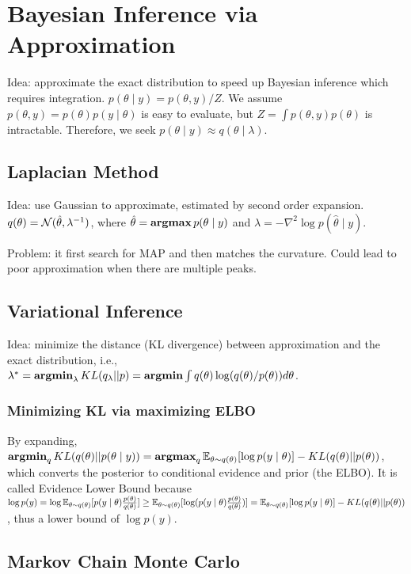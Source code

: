 \section{Bayesian Inference via Approximation}

Idea: approximate the exact distribution to speed up Bayesian inference which requires integration. $p(\theta\mid y) = p(\theta, y)/Z$. We assume $p(\theta, y)=p(\theta)p(y\mid\theta)$ is easy to evaluate, but $Z = \int p(\theta, y)p(\theta)$ is intractable. Therefore, we seek $p(\theta\mid y)\approx q(\theta \mid \lambda)$.

\subsection{Laplacian Method}

Idea: use Gaussian to approximate, estimated by second order expansion. $q(\theta)=\mathcal{N}(\hat{\theta}, \lambda^{-1})$, where $\hat{\theta}=\operatorname{\textbf{argmax}} p(\theta\mid y)$ and $\lambda = -\nabla^2 \log p(\hat{\theta}\mid y)$.

Problem: it first search for MAP and then matches the curvature. Could lead to poor approximation when there are multiple peaks.

\subsection{Variational Inference}

Idea: minimize the distance (KL divergence) between approximation and the exact distribution, i.e., $\lambda^* = \operatorname{\textbf{argmin}}_\lambda KL(q_\lambda||p) = \operatorname{\textbf{argmin}} \int q(\theta)\log(q(\theta)/p(\theta)) d\theta$.

\subsubsection*{Minimizing KL via maximizing ELBO}
By expanding, $\operatorname{\textbf{argmin}}_q KL(q(\theta)||p(\theta \mid y)) = \operatorname{\textbf{argmax}}_q \mathbb{E}_{\theta\sim q(\theta)} [\log p(y\mid\theta)] - KL(q(\theta)||p(\theta))$, which converts the posterior to conditional evidence and prior (the ELBO). It is called Evidence Lower Bound because $\log p(y) = \log \mathbb{E}_{\theta\sim q(\theta)}[p(y\mid \theta)\frac{p(\theta)}{q(\theta)}] \ge \mathbb{E}_{\theta\sim q(\theta)} [\log(p(y\mid \theta)\frac{p(\theta)}{q(\theta)})] = \mathbb{E}_{\theta\sim q(\theta)} [\log p(y\mid\theta)] - KL(q(\theta)||p(\theta))$, thus a lower bound of $\log p(y)$.


\subsection{Markov Chain Monte Carlo}

